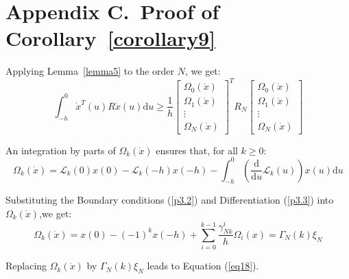 \documentclass[a4paper]{cas-sc}
\begin{document}
\section*{Appendix C.~Proof of Corollary~\ref{corollary9}}
\label{AppendixC}
Applying Lemma~\ref{lemma5} to the order $N$, we get:
\begin{equation}
  \int_{ - h}^0 {{{\dot x}^T}} (u)R\dot x(u){\text{d}}u \geqslant \frac{1}{h}{\left[ {\begin{array}{*{20}{c}}
            {{\Omega _0}(\dot x)} \\
            {{\Omega _1}(\dot x)} \\
            \vdots                \\
            {{\Omega _N}(\dot x)}
          \end{array}} \right]^T}{R_N}\left[ {\begin{array}{*{20}{c}}
          {{\Omega _0}(\dot x)} \\
          {{\Omega _1}(\dot x)} \\
          \vdots                \\
          {{\Omega _N}(\dot x)}
        \end{array}} \right]
  \label{C1}
\end{equation}


An integration by parts of ${\Omega _k}(\dot x)$ ensures that, for all $k \geqslant 0$:
\begin{equation}
  {\Omega _k}(\dot x) = {\mathcal{L}_k}(0)x(0) - {\mathcal{L}_k}( - h)x( - h) - \int_{ - h}^0 {\left( {\frac{{\text{d}}}{{{\text{d}}u}}{\mathcal{L}_k}(u)} \right)} x(u){\text{d}}u
  \label{C2}
\end{equation}

Substituting the Boundary conditions (\ref{p3.2}) and Differentiation (\ref{p3.3}) into ${\Omega _k}(\dot x)$,we get:
\begin{equation}
  {\Omega _k}(\dot x) = x(0) - {( - 1)^k}x( - h) + \sum\limits_{i = 0}^{k - 1} {\frac{{\gamma _{Nk}^i}}{h}} {\Omega _i}(x) = {\Gamma _N}(k){\xi _N}
  \label{C3}
\end{equation}

Replacing ${\Omega _k}(\dot x)$ by ${\Gamma _N}(k){\xi _N}$ leads to Equation (\ref{eq18}).
\end{document}
